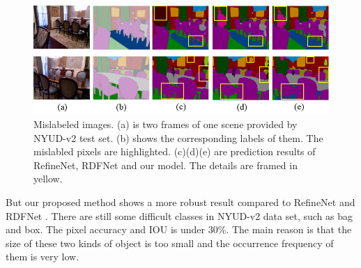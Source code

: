 \begin{figure}[!htbp]
	\setlength{\abovecaptionskip}{-0.2cm}
	\setlength{\belowcaptionskip}{-10cm}
	\centering
	\includegraphics[scale=0.4]{figure/Mislabels.png}
	\caption{Mislabeled images. (a) is two frames of one scene provided by NYUD-v2 test set. (b) shows the corresponding labels of them. The mislabled pixels are highlighted. (c)(d)(e) are prediction results of RefineNet, RDFNet and our model. The details are framed in yellow.}
	\label{fig:mislabels}
\end{figure}
%
But our proposed method shows a more robust result compared to RefineNet \cite{Lin2017} and RDFNet \cite{Park2017}.
%
There are still some difficult classes in NYUD-v2 data set, such as bag and box.
%
The pixel accuracy and IOU is under 30\%.
%
The main reason is that the size of these two kinds of object is too small and the occurrence frequency of them is very low. 






